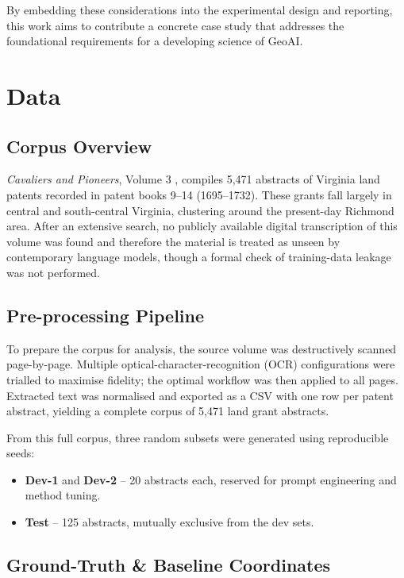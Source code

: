 By embedding these considerations into the experimental design and
reporting, this work aims to contribute a concrete case study that
addresses the foundational requirements for a developing science of
GeoAI.

\section{Data}\label{data}

\subsection{Corpus Overview}\label{corpus-overview}

\emph{Cavaliers and Pioneers}, Volume 3 \citep{Nugent1979_cavaliers3},
compiles 5,471 abstracts of Virginia land patents recorded in patent
books 9--14 (1695--1732). These grants fall largely in central and
south-central Virginia, clustering around the present-day Richmond area.
After an extensive search, no publicly available digital transcription
of this volume was found and therefore the material is treated as unseen
by contemporary language models, though a formal check of training-data
leakage was not performed.

\subsection{Pre-processing Pipeline}\label{pre-processing-pipeline}

To prepare the corpus for analysis, the source volume was destructively
scanned page-by-page. Multiple optical-character-recognition (OCR)
configurations were trialled to maximise fidelity; the optimal workflow
was then applied to all pages. Extracted text was normalised and
exported as a CSV with one row per patent abstract, yielding a complete
corpus of 5,471 land grant abstracts.

From this full corpus, three random subsets were generated using
reproducible seeds:

\begin{itemize}
\tightlist
\item
  \textbf{Dev-1} and \textbf{Dev-2} -- 20 abstracts each, reserved for
  prompt engineering and method tuning.
\item
  \textbf{Test} -- 125 abstracts, mutually exclusive from the dev sets.
\end{itemize}

\subsection{Ground-Truth \& Baseline
Coordinates}\label{ground-truth-baseline-coordinates}

